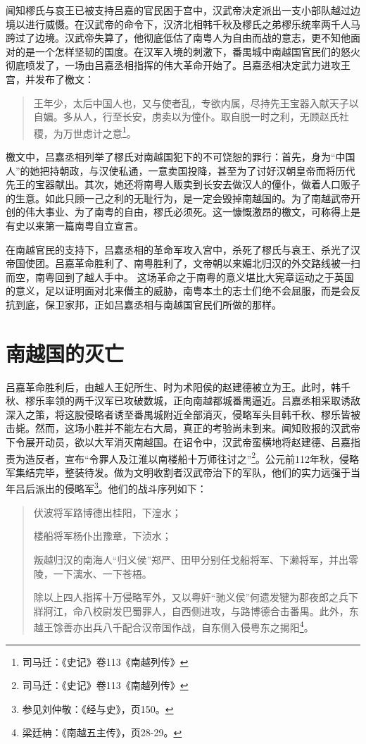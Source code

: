 闻知樛氏与哀王已被支持吕嘉的官民困于宫中，汉武帝决定派出一支小部队越过边境以进行威慑。在汉武帝的命令下，汉济北相韩千秋及樛氏之弟樛乐统率两千人马跨过了边境。汉武帝失算了，他彻底低估了南粤人为自由而战的意志，更不知他面对的是一个怎样坚韧的国度。在汉军入境的刺激下，番禺城中南越国官民们的怒火彻底喷发了，一场由吕嘉丞相指挥的伟大革命开始了。吕嘉丞相决定武力进攻王宫，并发布了檄文：

\begin{quote}
	王年少，太后中国人也，又与使者乱，专欲内属，尽持先王宝器入献天子以自媚。多从人，行至长安，虏卖以为僮仆。取自脱一时之利，无顾赵氏社稷，为万世虑计之意\footnote{司马迁：《史记》卷113《南越列传》}。
\end{quote}

檄文中，吕嘉丞相列举了樛氏对南越国犯下的不可饶恕的罪行：首先，身为“中国人”的她把持朝政，与汉使私通，一意卖国投降，甚至为了讨好汉朝皇帝而将历代先王的宝器献出。其次，她还将南粤人贩卖到长安去做汉人的僮仆，做着人口贩子的生意。如此只顾一己之利的无耻行为，是一定会毁掉南越国的。为了南越武帝开创的伟大事业、为了南粤的自由，樛氏必须死。这一慷慨激昂的檄文，可称得上是有史以来第一篇南粤自立宣言。

在南越官民的支持下，吕嘉丞相的革命军攻入宫中，杀死了樛氏与哀王、杀光了汉帝国使团。吕嘉革命胜利了、南粤胜利了，文帝朝以来媚北归汉的外交路线被一扫而空，南粤回到了越人手中。 这场革命之于南粤的意义堪比大宪章运动之于英国的意义，足以证明面对北来僭主的威胁，南粤本土的志士们绝不会屈服，而是会反抗到底，保卫家邦，正如吕嘉丞相与南越国官民们所做的那样。


\section{南越国的灭亡}

\indent 吕嘉革命胜利后，由越人王妃所生、时为术阳侯的赵建德被立为王。此时，韩千秋、樛乐率领的两千汉军已攻破数城，正向南越都城番禺逼近。吕嘉丞相采取诱敌深入之策，将这股侵略者诱至番禺城附近全部消灭，侵略军头目韩千秋、樛乐皆被击毙。然而，这场小胜并不能左右大局，真正的考验尚未到来。闻知败报的汉武帝下令展开动员，欲以大军消灭南越国。在诏令中，汉武帝蛮横地将赵建德、吕嘉指责为造反者，宣布“令罪人及江淮以南楼船十万师往讨之”\footnote{司马迁：《史记》卷113《南越列传》}。公元前112年秋，侵略军集结完毕，整装待发。做为文明收割者汉武帝治下的军队，他们的实力远强于当年吕后派出的侵略军\footnote{参见刘仲敬：《经与史》，页150。}。他们的战斗序列如下：

\begin{quote}
	伏波将军路博德出桂阳，下湟水；
	
	楼船将军杨仆出豫章，下浈水；
	
	叛越归汉的南海人“归义侯”郑严、田甲分别任戈船将军、下濑将军，并出零陵，一下漓水、一下苍梧。
	
	除以上四人指挥十万侵略军外，又以粤奸“驰义侯”何遗发犍为郡夜郎之兵下牂牁江，命八校尉发巴蜀罪人，自西侧进攻，与路博德合击番禺。此外，东越王馀善亦出兵八千配合汉帝国作战，自东侧入侵粤东之揭阳\footnote{梁廷柟：《南越五主传》，页28-29。}。
\end{quote}

